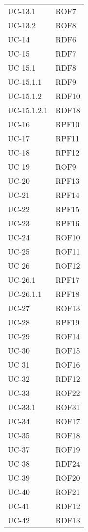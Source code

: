 \begin{longtable}{| p{5cm} | p{5cm} |}
		\rowcolor{LightGray}
		UC-13.1 & ROF7 \\
		UC-13.2 & ROF8 \\
		\rowcolor{LightGray}
		UC-14 & RDF6\\
		UC-15 & RDF7 \\
		\rowcolor{LightGray}
		UC-15.1 & RDF8\\
		UC-15.1.1 & RDF9\\
		\rowcolor{LightGray}
		UC-15.1.2 & RDF10\\
		UC-15.1.2.1 & RDF18\\
		\rowcolor{LightGray}
		UC-16 & RPF10\\
		UC-17 & RPF11\\
		\rowcolor{LightGray}
		UC-18 & RPF12 \\
		UC-19 & ROF9 \\
		\rowcolor{LightGray}
		UC-20 & RPF13 \\
		UC-21 & RPF14 \\
		\rowcolor{LightGray}
		UC-22 & RPF15 \\ 
		UC-23 & RPF16\\
		\rowcolor{LightGray}
		UC-24 & ROF10 \\
		UC-25 & ROF11 \\
		\rowcolor{LightGray}
		UC-26 & ROF12 \\
		UC-26.1 & RPF17 \\
		\rowcolor{LightGray}
		UC-26.1.1 & RPF18\\
		UC-27 & ROF13 \\
		\rowcolor{LightGray}
		UC-28 & RPF19 \\
		UC-29 & ROF14 \\
		\rowcolor{LightGray}
		UC-30 & ROF15 \\
		UC-31 & ROF16 \\
		\rowcolor{LightGray}
		UC-32 & RDF12\\
		UC-33 & ROF22\\
		\rowcolor{LightGray}
		UC-33.1 & ROF31\\
		UC-34 & ROF17\\
		\rowcolor{LightGray}
		UC-35 & ROF18\\
		\rowcolor{LightGray}
		UC-37 & ROF19\\
		UC-38 & RDF24\\
		\rowcolor{LightGray}
		UC-39 & ROF20\\
		UC-40 & ROF21\\
		\rowcolor{LightGray}
		UC-41 & RDF12\\
		UC-42 & RDF13\\

\end{longtable}
